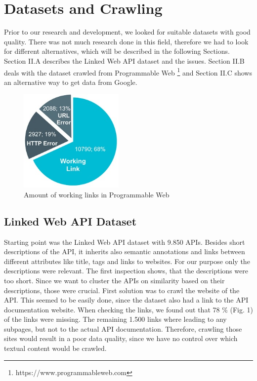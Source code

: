 \documentclass[a4paper]{IEEEtran}
\begin{document}
\section{Datasets and Crawling}
Prior to our research and development, we looked for suitable datasets with good quality. There was not much research done in this field, therefore we had to look for different alternatives, which will be described in the following Sections. Section II.A describes the Linked Web API dataset and the issues. Section II.B deals with the dataset crawled from Programmable Web  \footnote[1]{https://www.programmableweb.com} and Section II.C shows an alternative way to get data from Google.
\begin{figure}[!t]
\centering
\includegraphics[width= 2in]{img/pie.png}
\caption{Amount of working links in Programmable Web}
\label{fig_sim}
\end{figure}

\subsection{Linked Web API Dataset}
Starting point was the Linked Web API dataset \cite{dojchinovskilinked} with 9.850 APIs. Besides short descriptions of the API, it inherits also semantic annotations and links between different attributes like title, tags and links to websites. For our purpose only the descriptions were relevant. The first inspection shows, that the descriptions were too short. Since we want to cluster the APIs on similarity based on their descriptions, those were crucial. First solution was to crawl the website of the API. This seemed to be easily done, since the dataset also had a link to the API documentation website. When checking the links, we found out that 78 \% (Fig. 1) of the links were missing. The remaining 1.500 links where leading to any subpages, but not to the actual API documentation. Therefore, crawling those sites would result in a poor data quality, since we have no control over which textual content would be crawled.
\end{document}
